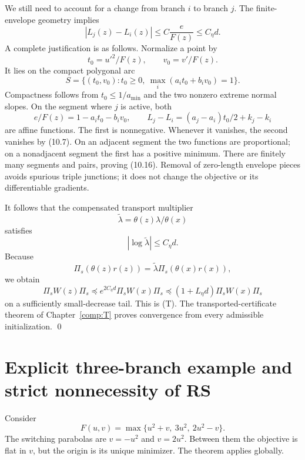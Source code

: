 We still need to account for a change from branch $i$ to branch $j$. The finite-envelope geometry implies
\begin{equation}
 |L_j(z)-L_i(z)|\le C\frac{e}{F(z)}\le C_\eta d. \tag{10.16}
\end{equation}
A complete justification is as follows. Normalize a point by
\[
 t_0=u'^2/F(z),\qquad v_0=v'/F(z).
\]
It lies on the compact polygonal arc
\[
 S=\{(t_0,v_0):t_0\ge0,\ \max_i(a_it_0+b_iv_0)=1\}.
\]
Compactness follows from $t_0\le1/a_{\min}$ and the two nonzero extreme normal slopes. On the segment where $j$ is active, both
\[
 e/F(z)=1-a_it_0-b_iv_0,\qquad
 L_j-L_i=(a_j-a_i)t_0/2+k_j-k_i
\]
are affine functions. The first is nonnegative. Whenever it vanishes, the second vanishes by (10.7). On an adjacent segment the two functions are proportional; on a nonadjacent segment the first has a positive minimum. There are finitely many segments and pairs, proving (10.16). Removal of zero-length envelope pieces avoids spurious triple junctions; it does not change the objective or its differentiable gradients.

It follows that the compensated transport multiplier
\[
 \widetilde\lambda=\theta(z)\lambda/\theta(x)
\]
satisfies
\begin{equation}
 |\log\widetilde\lambda|\le C_\eta d. \tag{10.17}
\end{equation}
Because
\[
 \Pi_s(\theta(z)r(z))=\widetilde\lambda\Pi_s(\theta(x)r(x)),
\]
we obtain
\[
 \Pi_sW(z)\Pi_s\preceq e^{2C_\eta d}\Pi_sW(x)\Pi_s
 \preceq(1+L_\eta d)\Pi_sW(x)\Pi_s
\]
on a sufficiently small-decrease tail. This is (T). The transported-certificate theorem of Chapter~\ref{comp:T} proves convergence from every admissible initialization. \qed


\setcounter{section}{5}
\setcounter{theorem}{2}
\setcounter{lemma}{0}
\setcounter{corollary}{0}
\setcounter{proposition}{0}
\setcounter{remark}{0}
\setcounter{equation}{13}


\section{Explicit three-branch example and strict nonnecessity of RS}
Consider
\begin{equation}
 F(u,v)=\max\{u^2+v,\ 3u^2,\ 2u^2-v\}. \tag{10.18}
\end{equation}
The switching parabolas are $v=-u^2$ and $v=2u^2$. Between them the objective is flat in $v$, but the origin is its unique minimizer. The theorem applies globally.

